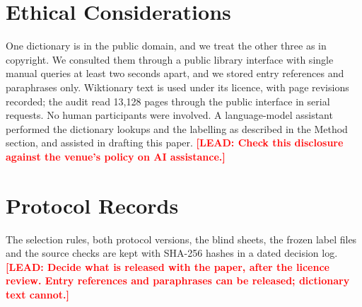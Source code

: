 \documentclass[11pt]{article}
\newcommand{\lead}[1]{\textcolor{red}{\textbf{[LEAD: #1]}}}
\begin{document}
\section*{Ethical Considerations}

One dictionary is in the public domain, and we treat the other three as in copyright. We consulted them through a public library interface with single manual queries at least two seconds apart, and we stored entry references and paraphrases only. Wiktionary text is used under its licence, with page revisions recorded; the audit read 13,128 pages through the public interface in serial requests. No human participants were involved. A language-model assistant performed the dictionary lookups and the labelling as described in the Method section, and assisted in drafting this paper. \lead{Check this disclosure against the venue's policy on AI assistance.}



\appendix

\section{Protocol Records}
\label{app:records}

The selection rules, both protocol versions, the blind sheets, the frozen label files and the source checks are kept with SHA-256 hashes in a dated decision log. \lead{Decide what is released with the paper, after the licence review. Entry references and paraphrases can be released; dictionary text cannot.}
\end{document}
